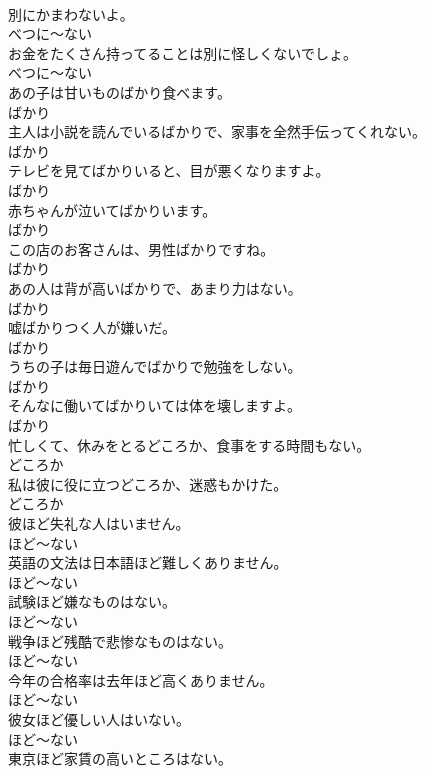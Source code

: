 \documentclass[8pt]{extreport}
\begin{document}
\begin{CJK}{UTF8}{min}
\\	別にかまわないよ。	
\\	べつに～ない
\\	お金をたくさん持ってることは別に怪しくないでしょ。	
\\	べつに～ない
\\	あの子は甘いものばかり食べます。	
\\	ばかり
\\	主人は小説を読んでいるばかりで、家事を全然手伝ってくれない。	
\\	ばかり
\\	テレビを見てばかりいると、目が悪くなりますよ。	
\\	ばかり
\\	赤ちゃんが泣いてばかりいます。	
\\	ばかり
\\	この店のお客さんは、男性ばかりですね。	
\\	ばかり
\\	あの人は背が高いばかりで、あまり力はない。	
\\	ばかり
\\	嘘ばかりつく人が嫌いだ。	
\\	ばかり
\\	うちの子は毎日遊んでばかりで勉強をしない。	
\\	ばかり
\\	そんなに働いてばかりいては体を壊しますよ。	
\\	ばかり
\\	忙しくて、休みをとるどころか、食事をする時間もない。	
\\	どころか
\\	私は彼に役に立つどころか、迷惑もかけた。	
\\	どころか
\\	彼ほど失礼な人はいません。	
\\	ほど～ない
\\	英語の文法は日本語ほど難しくありません。	
\\	ほど～ない
\\	試験ほど嫌なものはない。	
\\	ほど～ない
\\	戦争ほど残酷で悲惨なものはない。	
\\	ほど～ない
\\	今年の合格率は去年ほど高くありません。	
\\	ほど～ない
\\	彼女ほど優しい人はいない。	
\\	ほど～ない
\\	東京ほど家賃の高いところはない。	

\end{CJK}
\end{document}
